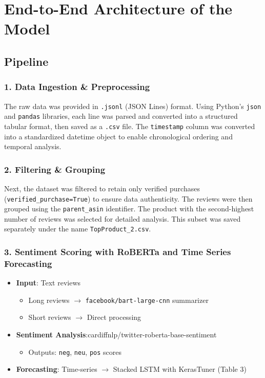 \documentclass[letterpaper]{article}
\begin{document}
\section{End-to-End Architecture of the Model}

\subsection*{Pipeline}
\subsubsection{1. Data Ingestion & Preprocessing}
The raw data was provided in \texttt{.jsonl} (JSON Lines) format. Using Python’s \texttt{json} and \texttt{pandas} libraries, each line was parsed and converted into a structured tabular format, then saved as a \texttt{.csv} file. The \texttt{timestamp} column was converted into a standardized datetime object to enable chronological ordering and temporal analysis.

\subsubsection{2. Filtering & Grouping}
Next, the dataset was filtered to retain only verified purchases (\texttt{verified\_purchase=True}) to ensure data authenticity. The reviews were then grouped using the \texttt{parent\_asin} identifier. The product with the second-highest number of reviews was selected for detailed analysis. This subset was saved separately under the name \texttt{TopProduct\_2.csv}.

\subsubsection{3. Sentiment Scoring with RoBERTa and Time Series Forecasting}

\begin{itemize}
    \item \textbf{Input}: Text reviews 
    \begin{itemize}
        \item Long reviews $\rightarrow$ \texttt{facebook/bart-large-cnn} summarizer
        \item Short reviews $\rightarrow$ Direct processing
    \end{itemize}
    \item \textbf{Sentiment Analysis}:cardiffnlp/twitter-roberta-base-sentiment
    \begin{itemize}
        \item Outputs: \texttt{neg}, \texttt{neu}, \texttt{pos} scores
    \end{itemize}
    \item \textbf{Forecasting}: Time-series $\rightarrow$ Stacked LSTM with KerasTuner (Table 3)
\end{itemize}
\end{document}
